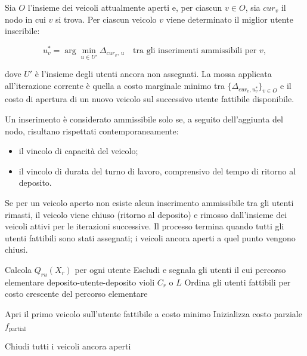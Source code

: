 Sia $O$ l'insieme dei veicoli attualmente aperti e, per ciascun $v \in O$, sia $cur_v$ il nodo in cui $v$ si trova. Per ciascun veicolo $v$ viene determinato il miglior utente inseribile:

\[
u^*_v = \arg\min_{u \in U'} \Delta_{cur_v,\,u} \quad \text{tra gli inserimenti ammissibili per } v,
\]

dove $U'$ è l'insieme degli utenti ancora non assegnati. La mossa applicata all'iterazione corrente è quella a costo marginale minimo tra $\{\Delta_{cur_v, u^*_v}\}_{v \in O}$ e il costo di apertura di un nuovo veicolo sul successivo utente fattibile disponibile.

Un inserimento è considerato ammissibile solo se, a seguito dell'aggiunta del nodo, risultano rispettati contemporaneamente:

\begin{itemize}
	\item il vincolo di capacità del veicolo;
	\item il vincolo di durata del turno di lavoro, comprensivo del tempo di ritorno al deposito.
\end{itemize}

Se per un veicolo aperto non esiste alcun inserimento ammissibile tra gli utenti rimasti, il veicolo viene chiuso (ritorno al deposito) e rimosso dall'insieme dei veicoli attivi per le iterazioni successive. Il processo termina quando tutti gli utenti fattibili sono stati assegnati; i veicoli ancora aperti a quel punto vengono chiusi.

\begin{algorithm}[H]
	\caption{Euristica Greedy (\emph{cheapest insertion} multi-rotta) per la costruzione delle rotte}
	
	Calcola $Q_{ru}(X_r)$ per ogni utente\;
	Escludi e segnala gli utenti il cui percorso elementare deposito-utente-deposito violi $C_r$ o $L$\;
	Ordina gli utenti fattibili per costo crescente del percorso elementare\;
	
	Apri il primo veicolo sull'utente fattibile a costo minimo\;
	Inizializza costo parziale $f_{\text{partial}}$\;
	
	Chiudi tutti i veicoli ancora aperti\;
\end{algorithm}

